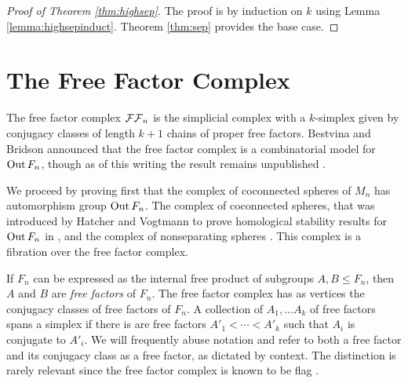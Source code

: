 
\begin{proof}[Proof of Theorem  \ref{thm:highsep}]
The proof is by induction on $k$ using Lemma \ref{lemma:highsepinduct}.
Theorem \ref{thm:sep} provides the base case.
\end{proof}



\section{The Free Factor Complex}
\label{section:ffc}

The free factor complex ${ \mathcal {FF}_n }$ is the simplicial complex with a $k$-simplex given by conjugacy classes of length $k+1$ chains of proper free factors.
Bestvina and Bridson announced that the free factor complex is a combinatorial model for $\operatorname{Out} F_n$,
though as of this writing the result remains unpublished \cite{bridson}.


\bridson*


We proceed by proving first that the complex of coconnected spheres of $M_n$
has automorphism group $\operatorname{Out} F_n$.
The complex of coconnected spheres, that was introduced by Hatcher and Vogtmann to prove
homological stability results for $\operatorname{Out} F_n$ in \cite{homstabout},
and the complex of nonseparating spheres \cite{pandit}.
This complex is a fibration over the free factor complex.

\begin{definition}
If $F_n$ can be expressed as the internal free product of subgroups $A,B \leqslant F_n$, then $A$ and $B$ are \emph{free factors} of $F_n$.
The free factor complex has as vertices the conjugacy classes of free factors of $F_n$.
A collection of $A_1, \ldots A_k$ of free factors spans a simplex if there is
are free factors  $A'_1 < \cdots < A'_k$ such that $A_i$ is conjugate to $A'_i$.
We will frequently abuse notation and refer to both a free factor and its conjugacy class as a free factor, as dictated by context.
The distinction is rarely relevant since the free factor complex is known to be flag \cite{MR1660045}.
\end{definition}

